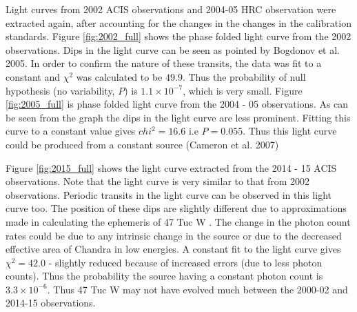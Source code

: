 \documentclass[a4paper,fleqn,usenatbib]{mnras}
\begin{document}
Light curves from 2002 ACIS observations and 2004-05 HRC observation were extracted again, after accounting for the changes in the
changes in the calibration standards. Figure \ref{fig:2002_full} shows the phase folded light curve from the 2002 observations.
Dips in the light curve can be seen as pointed by Bogdonov et al. 2005. In order to confirm the nature
of these transits, the data was fit to a constant and $\chi^2$ was calculated to be $49.9$. Thus the probability of null hypothesis (no variability, $P$) is $1.1 \times 10^{-7}$, which is very small. Figure \ref{fig:2005_full} is phase folded light curve from the 2004 - 05 observations. As can
be seen from the graph the dips in the light curve are less prominent. Fitting this curve to a constant value gives
$chi^2 = 16.6$ i.e $P = 0.055$. Thus this light curve could be produced from a constant source (Cameron et al. 2007)

Figure \ref{fig:2015_full} shows the light curve extracted from the 2014 - 15 ACIS observations. Note that the light curve is very
similar to that from 2002 observations. Periodic transits in the light curve can be observed in this light curve too. The position of
these dips are slightly different due to approximations made in calculating the ephemeris of 47 Tuc W . The change in the photon count rates could be due to any intrinsic change in the source or due to the decreased effective area of Chandra in low energies. A constant fit to the light curve gives 
$\chi^2 = 42.0$  - slightly reduced because of increased errors (due to less photon counts). Thus the probability the source having a constant photon count is $3.3 \times 10^{-6}$. Thus 47 Tuc W may not have evolved much between the 2000-02 and 2014-15 observations.
\end{document}

